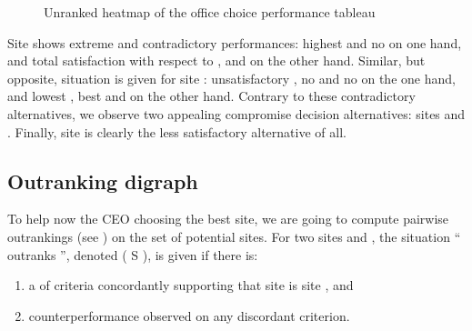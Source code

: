 \documentclass[a4paper,12pt,english]{sphinxhowto}
\let\sphinxpxdimen\pdfpxdimen\else\newdimen\sphinxpxdimen
\begin{document}
\begin{sphinxVerbatim}[commandchars=\\\{\}]
\PYGZbs{}
\end{sphinxVerbatim}

\begin{figure}[H]
\centering
\capstart

\noindent\sphinxincludegraphics[width=500\sphinxpxdimen]{{officeChoiceHeatmap}.png}
\caption{Unranked heatmap of the office choice performance tableau}\label{\detokenize{tutorial:officechoiceheatmap}}\end{figure}

Site  shows extreme and contradictory performances: highest  and no  on one hand, and total satisfaction with respect to ,  and  on the other hand. Similar, but opposite, situation is given for site : unsatisfactory , no  and no  on the one hand, and lowest , best  and  on the other hand. Contrary to these contradictory alternatives, we observe two appealing compromise decision alternatives: sites  and . Finally, site  is clearly the less satisfactory alternative of all.


\subsection{Outranking digraph}
\label{\detokenize{tutorial:outranking-digraph}}
To help now the CEO choosing the best site, we are going to compute pairwise outrankings (see ) on the set of potential sites. For two sites  and , the situation “ outranks ”, denoted ( S ), is given if there is:
\begin{enumerate}
%
\item {} 
a  of criteria concordantly supporting that site  is  site , and

\item {} 
 counter\sphinxhyphen{}performance observed on any discordant criterion.

\end{enumerate}
\end{document}
